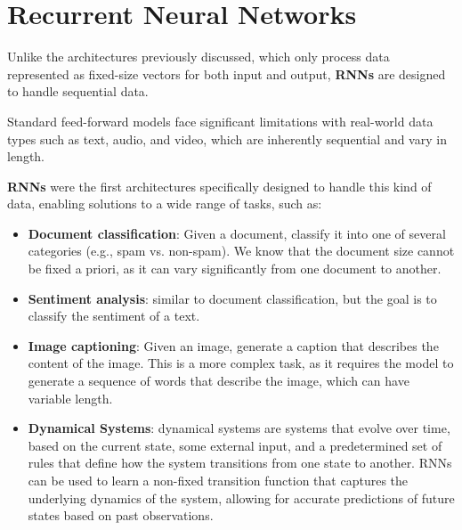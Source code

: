 \section{Recurrent Neural Networks}
Unlike the architectures previously discussed, which only process data represented as fixed-size vectors for both input and output,
\textbf{RNNs} are designed to handle sequential data.

Standard feed-forward models face significant limitations with real-world data types such as text, audio, and video, which are inherently sequential and vary in length.

\textbf{RNNs} were the first architectures specifically designed to handle
this kind of data, enabling solutions to a wide range of tasks, such as:
\begin{itemize}
    \item \textbf{Document classification}: Given a document, classify it into one of several categories (e.g., spam vs. non-spam).
    We know that the document size cannot be fixed a priori, as it can vary significantly from one document to another.
    \item \textbf{Sentiment analysis}: similar to document classification, but the goal is to classify the sentiment of a text.
    \item \textbf{Image captioning}: Given an image, generate a caption that describes the content of the image.
    This is a more complex task, as it requires the model to generate a sequence of words that describe the image, which can have variable length.
    \item \textbf{Dynamical Systems}: dynamical systems are systems that evolve over time, based on the current state, some external input,
    and a predetermined set of rules that define how the system transitions from one state to another.
    RNNs can be used to learn a non-fixed transition function that captures the underlying dynamics of the system, allowing for accurate predictions of future states based on past observations.
\end{itemize}

